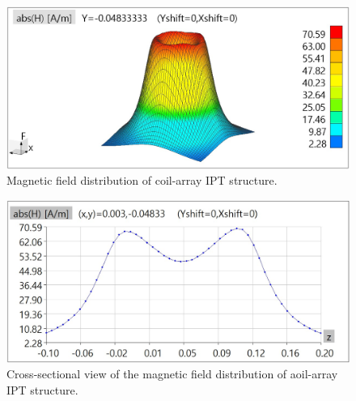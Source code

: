 \begin{figure}[!t]
    \centering
    \includegraphics[width=0.9\linewidth]{images/4_coil_array_near_field_distribution.JPG}
    \caption{Magnetic field distribution of coil-array IPT structure.}
    \label{fig: magnetic distribution of coil array}
\end{figure}

\begin{figure}[!t]
    \centering
    \includegraphics[width=0.9\linewidth]{images/4_coil_array_near_field_distribution_cut.JPG}
    \caption{Cross-sectional view of the magnetic field distribution of aoil-array IPT structure.}
    \label{fig: magnetic distribution of coil array cut}
\end{figure}

